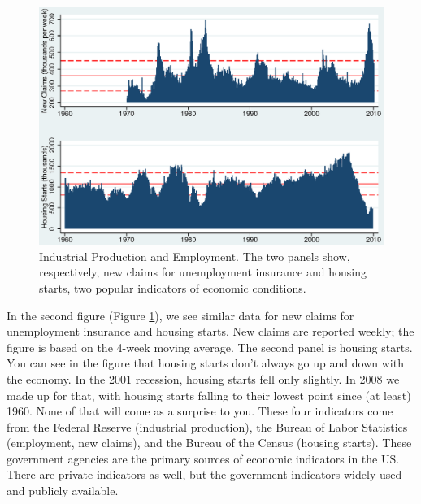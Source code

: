 \documentclass[letterpaper,12pt]{article}
\begin{document}
\begin{figure}[h!]
    \centering
    \includegraphics[scale=0.8]{newclaims_hs.eps}
    \caption{Industrial Production and Employment.
    The two panels show, respectively,
    new claims for unemployment insurance
    and housing starts, two popular indicators of economic conditions.}
    \label{fig:newclaims_hs}%
\end{figure}


In the second figure (Figure \ref{fig:newclaims_hs}),
we see similar data for new claims for unemployment insurance
and housing starts.
New claims are reported weekly; the figure is
based on the 4-week moving average.
The second panel is housing starts.
You can see in the figure that housing starts don't always go up
and down with the economy.
In the 2001 recession,
housing starts fell only slightly.
In 2008 we made up for that,
with housing starts falling to their lowest point
since (at least) 1960.
None of that will come as a surprise to you.
These four indicators come from the Federal Reserve (industrial production),
the Bureau of Labor Statistics (employment, new claims),
and the Bureau of the Census (housing starts).
These government agencies are the primary sources of economic indicators
in the US.
There are private indicators as well,
but the government indicators widely used and publicly available.
\end{document}
